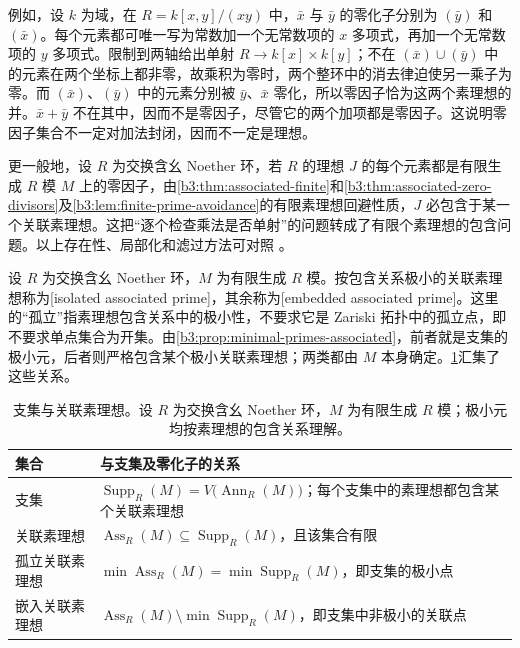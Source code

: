 例如，设 \(k\) 为域，在 \(R=k[x,y]/(xy)\) 中，\(\bar x\) 与 \(\bar y\) 的零化子分别为 \((\bar y)\) 和 \((\bar x)\)。每个元素都可唯一写为常数加一个无常数项的 \(x\) 多项式，再加一个无常数项的 \(y\) 多项式。限制到两轴给出单射 \(R\to k[x]\times k[y]\)；不在 \((\bar x)\cup(\bar y)\) 中的元素在两个坐标上都非零，故乘积为零时，两个整环中的消去律迫使另一乘子为零。而 \((\bar x)\)、\((\bar y)\) 中的元素分别被 \(\bar y\)、\(\bar x\) 零化，所以零因子恰为这两个素理想的并。\(\bar x+\bar y\) 不在其中，因而不是零因子，尽管它的两个加项都是零因子。这说明零因子集合不一定对加法封闭，因而不一定是理想。

\ProseParagraphBreak
更一般地，设 \(R\) 为交换含幺 Noether 环，若 \(R\) 的理想 \(J\) 的每个元素都是有限生成 \(R\) 模 \(M\) 上的零因子，由\cref{b3:thm:associated-finite}和\cref{b3:thm:associated-zero-divisors}及\cref{b3:lem:finite-prime-avoidance}的有限素理想回避性质，\(J\) 必包含于某一个关联素理想。这把“逐个检查乘法是否单射”的问题转成了有限个素理想的包含问题。以上存在性、局部化和滤过方法可对照 \cite[\S6, Theorems 6.1--6.5]{Matsumura1989CommutativeRingTheory}。

\ProseParagraphBreak
设 \(R\) 为交换含幺 Noether 环，\(M\) 为有限生成 \(R\) 模。按包含关系极小的关联素理想称为[isolated associated prime]，其余称为[embedded associated prime]。这里的“孤立”指素理想包含关系中的极小性，不要求它是 Zariski 拓扑中的孤立点，即不要求单点集合为开集。由\cref{b3:prop:minimal-primes-associated}，前者就是支集的极小元，后者则严格包含某个极小关联素理想；两类都由 \(M\) 本身确定。\cref{b3:tab:support-associated-primes}汇集了这些关系。

\begin{table}[htbp]
	\centering
	\caption[支集与关联素理想]{支集与关联素理想。设 \(R\) 为交换含幺 Noether 环，\(M\) 为有限生成 \(R\) 模；极小元均按素理想的包含关系理解。}
	\label{b3:tab:support-associated-primes}
	\begin{tabularx}{\textwidth}{@{}>{\raggedright\arraybackslash}p{}>{\raggedright\arraybackslash}X@{}}
		\toprule
		集合 & 与支集及零化子的关系 \\
		\midrule
		支集 & \(\operatorname{Supp}_R(M)=V\bigl(\operatorname{Ann}_R(M)\bigr)\)；每个支集中的素理想都包含某个关联素理想 \\
		关联素理想 & \(\operatorname{Ass}_R(M)\subseteq\operatorname{Supp}_R(M)\)，且该集合有限 \\
		孤立关联素理想 & \(\min\operatorname{Ass}_R(M)=\min\operatorname{Supp}_R(M)\)，即支集的极小点 \\
		嵌入关联素理想 & \(\operatorname{Ass}_R(M)\setminus\min\operatorname{Supp}_R(M)\)，即支集中非极小的关联点 \\
		\bottomrule
	\end{tabularx}
\end{table}
